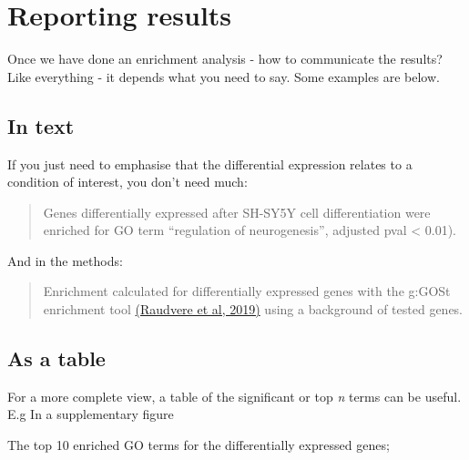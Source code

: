 \documentclass[
]{book}
\begin{document}
\hypertarget{reporting-results}{%
\chapter{Reporting results}\label{reporting-results}}

Once we have done an enrichment analysis - how to communicate the results? Like everything - it depends what you need to say. Some examples are below.

\hypertarget{in-text}{%
\section{In text}\label{in-text}}

If you just need to emphasise that the differential expression relates to a condition of interest, you don't need much:

\begin{quote}
Genes differentially expressed after SH-SY5Y cell differentiation were enriched for GO term ``regulation of neurogenesis'', adjusted pval \textless{} 0.01).
\end{quote}

And in the methods:

\begin{quote}
Enrichment calculated for differentially expressed genes with the g:GOSt enrichment tool \href{https://academic.oup.com/nar/article/47/W1/W191/5486750}{(Raudvere et al, 2019)} using a background of tested genes.
\end{quote}

\hypertarget{as-a-table}{%
\section{As a table}\label{as-a-table}}

For a more complete view, a table of the significant or top \emph{n} terms can be useful. E.g In a supplementary figure

The top 10 enriched GO terms for the differentially expressed genes;
\end{document}
